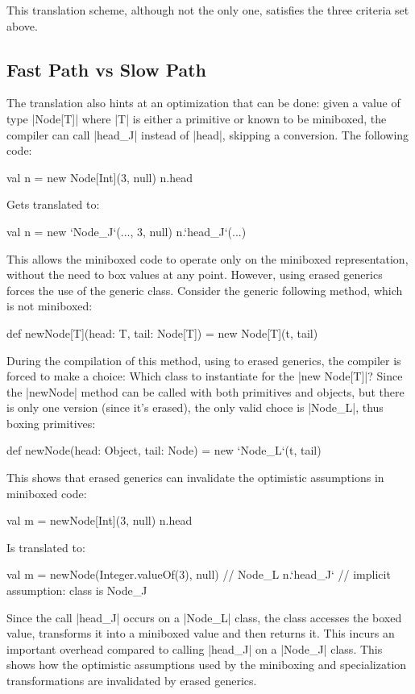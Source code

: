 This translation scheme, although not the only one, satisfies the three criteria set above.

\subsection{Fast Path vs Slow Path}

The translation also hints at an optimization that can be done: given a value of type |Node[T]| where |T| is either a primitive or known to be miniboxed, the compiler can call |head_J| instead of |head|, skipping a conversion. The following code:

\begin{lstlisting-nobreak}
 val n = new Node[Int](3, null)
 n.head
\end{lstlisting-nobreak}

Gets translated to:

\begin{lstlisting-nobreak}
 val n = new `Node_J`(..., 3, null)
 n.`head_J`(...)
\end{lstlisting-nobreak}

This allows the miniboxed code to operate only on the miniboxed representation, without the need to box values at any point. However, using erased generics forces the use of the generic class. Consider the generic following method, which is not miniboxed:

\begin{lstlisting-nobreak}
 def newNode[T](head: T, tail: Node[T]) =
   new Node[T](t, tail)
\end{lstlisting-nobreak}

During the compilation of this method, using to erased generics, the compiler is forced to make a choice: Which class to instantiate for the |new Node[T]|? Since the |newNode| method can be called with both primitives and objects, but there is only one version (since it's erased), the only valid choce is |Node_L|, thus boxing primitives:

\begin{lstlisting-nobreak}
 def newNode(head: Object, tail: Node) =
   new `Node_L`(t, tail)
\end{lstlisting-nobreak}

This shows that erased generics can invalidate the optimistic assumptions in miniboxed code:

\begin{lstlisting-nobreak}
 val m = newNode[Int](3, null)
 n.head
\end{lstlisting-nobreak}

Is translated to:

\begin{lstlisting-nobreak}
 val m = newNode(Integer.valueOf(3), null) // Node_L
 n.`head_J`        // implicit assumption: class is Node_J
\end{lstlisting-nobreak}

Since the call |head_J| occurs on a |Node_L| class, the class accesses the boxed value, transforms it into a miniboxed value and then returns it. This incurs an important overhead compared to calling |head_J| on a |Node_J| class. This shows how the optimistic assumptions used by the miniboxing and specialization transformations are invalidated by erased generics.
